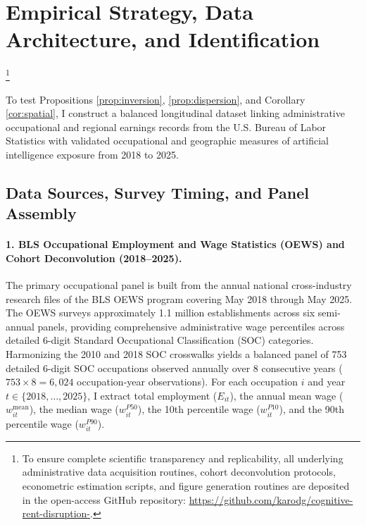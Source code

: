 \documentclass[12pt]{article}
\begin{document}
\section{Empirical Strategy, Data Architecture, and Identification}\footnote{To ensure complete scientific transparency and replicability, all underlying administrative data acquisition routines, cohort deconvolution protocols, econometric estimation scripts, and figure generation routines are deposited in the open-access GitHub repository: \url{https://github.com/karodg/cognitive-rent-disruption-}.}
\label{sec:data}

To test Propositions \ref{prop:inversion}, \ref{prop:dispersion}, and Corollary \ref{cor:spatial}, I construct a balanced longitudinal dataset linking administrative occupational and regional earnings records from the U.S. Bureau of Labor Statistics with validated occupational and geographic measures of artificial intelligence exposure from 2018 to 2025.

\subsection{Data Sources, Survey Timing, and Panel Assembly}

\paragraph{1. BLS Occupational Employment and Wage Statistics (OEWS) and Cohort Deconvolution (2018--2025).}
The primary occupational panel is built from the annual national cross-industry research files of the BLS OEWS program covering May 2018 through May 2025. The OEWS surveys approximately 1.1 million establishments across six semi-annual panels, providing comprehensive administrative wage percentiles across detailed 6-digit Standard Occupational Classification (SOC) categories. Harmonizing the 2010 and 2018 SOC crosswalks yields a balanced panel of 753 detailed 6-digit SOC occupations observed annually over 8 consecutive years ($753 \times 8 = 6,024$ occupation-year observations). For each occupation $i$ and year $t \in \{2018, \dots, 2025\}$, I extract total employment ($E_{it}$), the annual mean wage ($w_{it}^{\text{mean}}$), the median wage ($w_{it}^{P50}$), the 10th percentile wage ($w_{it}^{P10}$), and the 90th percentile wage ($w_{it}^{P90}$).
\end{document}
